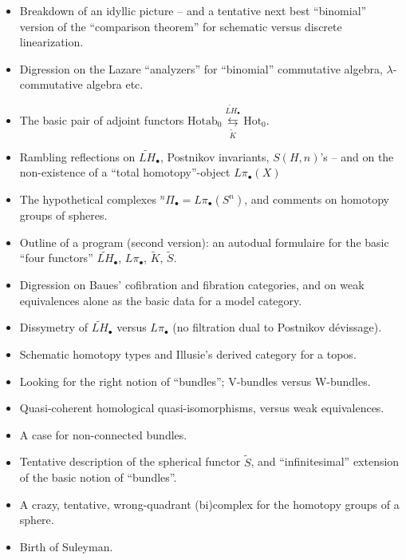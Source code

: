 \documentclass[11pt,a4paper]{article}
\begin{document}
\begin{itemize}
  \item[(119.)] Breakdown of an idyllic picture -- and a tentative next best ``binomial'' version of the ``comparison theorem'' for schematic versus discrete linearization.
  \item[120.] Digression on the Lazare ``analyzers'' for ``binomial'' commutative algebra, $\lambda$-commutative algebra etc.
  \item[121.] The basic pair of adjoint functors $\mathrm{Hotab}_{0} \underset{\widetilde{K}}{\overset{\widetilde{LH}_{\bullet}}{\leftrightarrows}} \mathrm{Hot}_{0}$.
  \item[122.] Rambling reflections on $\widetilde{LH}_{\bullet}$, Postnikov invariants, $S(H,n)$'s -- and on the non-existence of a ``total homotopy''-object $L\pi_{\bullet}(X)$  
  \item[123.] The hypothetical complexes ${}^{n}\Pi_{\bullet}=L\pi_{\bullet}(S^{n})$, and comments on homotopy groups of spheres.
  \item[(124.)] Outline of a program (second version): an autodual formulaire for the basic ``four functors'' $\widetilde{LH}_{\bullet}$, $L\pi_{\bullet}$, $\widetilde{K}$, $\widetilde{S}$.
  \item[125.] Digression on Baues' cofibration and fibration categories, and on weak equivalences alone as the basic data for a model category.
  \item[126.] Dissymetry of $\widetilde{LH}_{\bullet}$ versus $L\pi_{\bullet}$ (no filtration dual to Postnikov dévissage).
  \item[127.] Schematic homotopy types and Illusie's derived category for a topos.
  \item[128.] Looking for the right notion of ``bundles''; V-bundles versus W-bundles.
  \item[129.] Quasi-coherent homological quasi-isomorphisms, versus weak equivalences.
  \item[130.] A case for non-connected bundles.
  \item[(131.)] Tentative description of the spherical functor $\widetilde{S}$, and ``infinitesimal'' extension of the basic notion of ``bundles''.
  \item[(132.)] A crazy, tentative, wrong-quadrant (bi)complex for the homotopy groups of a sphere.
  \item[133.] Birth of Suleyman.
\end{itemize}
\end{document}
